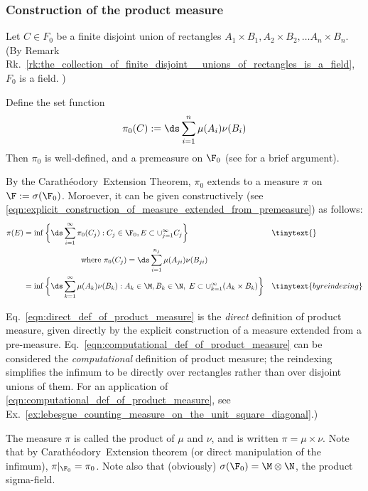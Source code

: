 \documentclass{article} %
\newcommand{\Caratheodory}{Carath\'eodory}
\begin{document}
\subsubsection{Construction of the product measure} \label{sec:construction_of_the_product_measure}

Let $C \in F_0$ be a finite disjoint union of rectangles $A_1 \times B_1, A_2 \times B_2, \hdots A_n \times B_n$.  {\tiny  (By Remark Rk.~\ref{rk:the_collection_of_finite_disjoint__unions_of_rectangles_is_a_field},  $F_0$ is a field. ) }

Define the set function 
\[ \pi_0 (C) := \ds\sum_{i=1}^n \mu(A_i) \nu(B_i) \]
Then $\pi_0$ is well-defined, and a premeasure on $\F_0$ (see \cite[pp.64]{folland1999real} for a brief argument). 

By the \Caratheodory~Extension Theorem, $\pi_0$ extends to a measure $\pi$ on $\F:=\sigma(\F_0)$.  Moroever, it can be given constructively (see \eqref{eqn:explicit_construction_of_measure_extended_from_premeasure}) as follows:
\begin{subequations}
\begin{align}
\pi(E) &= \inf \bigg\{ \ds\sum_{i=1}^\infty \pi_0 (C_j) : C_j \in \F_0,  E \subset \cup_{j=1}^\infty C_j \bigg\} && \tinytext{} \label{eqn:direct_def_of_product_measure} \\	
& \quad \quad \quad \quad  \quad \quad \quad  \text{ where }  \pi_0 (C_j) = \ds\sum_{i=1}^{n_j} \mu(A_{ji}) \nu(B_{ji})  \nonumber \\
&=\inf \bigg\{ \ds\sum_{k=1}^\infty \mu(A_k) \nu(B_k) : A_k \in \M, B_k \in \N, \;  E \subset \cup_{k=1}^\infty (A_k \times B_k) \bigg \} && \tinytext{by reindexing} \label{eqn:computational_def_of_product_measure}	
\end{align}
\end{subequations}

{\tiny Eq.~\eqref{eqn:direct_def_of_product_measure} is the \textit{direct} definition of product measure, given directly by the explicit construction of a measure extended from a pre-measure.   Eq.~\ref{eqn:computational_def_of_product_measure} can be considered the \textit{computational} definition of product measure; the reindexing simplifies the infimum to be directly over rectangles rather than over disjoint unions of them. For an application of \eqref{eqn:computational_def_of_product_measure}, see Ex.~\ref{ex:lebesgue_counting_measure_on_the_unit_square_diagonal}.) }

The measure $\pi$ is called the product of $\mu$ and $\nu$, and is written $\pi = \mu \times \nu$.  Note that by \Caratheodory~Extension theorem {\tiny (or direct manipulation of the infimum)}, $\pi|_{\F_0} = \pi_0$.  Note also that (obviously) $\sigma(\F_0) = \M \otimes \N$, the product sigma-field.  
\end{document}
